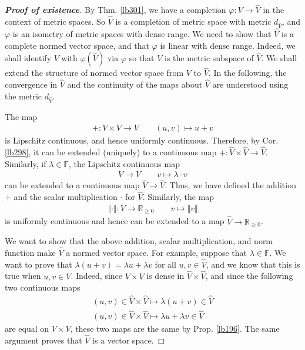 \documentclass[12pt,b5paper,notitlepage]{article}
\theoremstyle{definition}
\theoremstyle{plain}
\newcommand{\wht}{\widehat}
\newcommand{\Rbb}{\mathbb R}
\newcommand{\Fbb}{\mathbb F}
\numberwithin{equation}{section}
\begin{document}
\begin{proof}[\textbf{Proof of existence}]
By Thm. \ref{lb301}, we have a completion $\varphi:V\rightarrow\wht V$ in the context of metric spaces. So $\wht V$ is a completion of metric space with metric $d_{\wht V}$, and $\varphi$ is an isometry of metric spaces with dense range. We need to show that $\wht V$ is a complete normed vector space, and that $\varphi$ is linear with dense range. Indeed, we shall identify $V$ with $\varphi(\wht V)$ via $\varphi$ so that $V$ is the metric subspace of $\wht V$. We shall extend the structure of normed vector space from $V$ to $\wht V$. In the following, the convergence in $\wht V$ and the continuity of the maps about $\wht V$ are understood using the metric $d_{\wht V}$. 

The map
\begin{gather*}
+:V\times V\rightarrow V\qquad (u,v)\mapsto u+v
\end{gather*}
is Lipschitz continuous, and hence uniformly continuous. Therefore, by Cor. \ref{lb298}, it can be extended (uniquely) to a continuous map $+:\wht V\times\wht V\rightarrow\wht V$. Similarly, if $\lambda\in\Fbb$, the Lipschitz continuous map
\begin{gather*}
V\rightarrow V\qquad v\mapsto \lambda\cdot v
\end{gather*}
can be extended to a continuous map $\wht V\rightarrow\wht V$. Thus, we have defined the addition $+$ and the scalar multiplication $\cdot$ for $\wht V$. Similarly, the map
\begin{align*}
\Vert \cdot\Vert:V\rightarrow\Rbb_{\geq0}  \qquad v\mapsto\Vert v\Vert
\end{align*}
is uniformly continuous and hence can be extended to a map $\wht V\rightarrow\Rbb_{\geq0}$.


We want to show that the above addition, scalar multiplication, and norm function make $\wht V$ a normed vector space.  For example, suppose that $\lambda\in\Fbb$. We want to prove that $\lambda(u+v)=\lambda u+\lambda v$ for all $u,v\in\wht V$, and we know that this is true when $u,v\in V$. Indeed, since $V\times V$ is dense in $\wht V\times\wht V$, and since the following two continuous maps
\begin{gather*}
(u,v)\in\wht V\times\wht V\mapsto \lambda(u+v)\in\wht V\\
(u,v)\in\wht V\times\wht V\mapsto \lambda u+\lambda v\in\wht V
\end{gather*}
are equal on $V\times V$, these two maps are the same by Prop. \ref{lb196}. The same argument proves that $\wht V$ is a vector space.



\end{proof}
\end{document}

